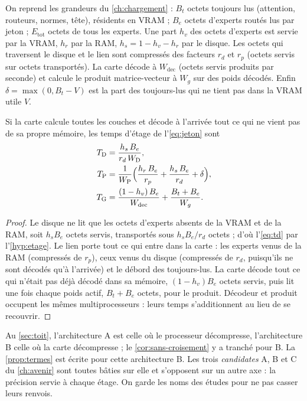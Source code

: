 On reprend les grandeurs du \cref{ch:chargement} : $B_t$ octets toujours lus (attention, routeurs, normes, tête), résidents en VRAM ; $B_e$ octets d'experts routés lus par jeton ; $E_{\mathrm{tot}}$ octets de tous les experts. Une part $h_v$ des octets d'experts est servie par la VRAM, $h_r$ par la RAM, $h_s = 1 - h_v - h_r$ par le disque. Les octets qui traversent le disque et le lien sont compressés des facteurs $r_d$ et $r_p$ (octets servis sur octets transportés). La carte décode à $W_{\mathrm{dec}}$ (octets servis produits par seconde) et calcule le produit matrice-vecteur à $W_g$ sur des poids décodés. Enfin $\delta = \max(0, B_t - V)$ est la part des toujours-lus qui ne tient pas dans la VRAM utile $V$.

\begin{proposition}\label{prop:termes}
Si la carte calcule toutes les couches et décode à l'arrivée tout ce qui ne vient pas de sa propre mémoire, les temps d'étage de l'\cref{eq:jeton} sont
\begin{align}
T_{\mathrm{D}} &= \frac{h_s\,B_e}{r_d\,W_{\mathrm{D}}}, \label{eq:td}\\
T_{\mathrm{P}} &= \frac{1}{W_{\mathrm{P}}}\Bigl(\frac{h_r\,B_e}{r_p} + \frac{h_s\,B_e}{r_d} + \delta\Bigr), \label{eq:tp}\\
T_{\mathrm{G}} &= \frac{(1-h_v)\,B_e}{W_{\mathrm{dec}}} + \frac{B_t + B_e}{W_g}. \label{eq:tg}
\end{align}
\end{proposition}

\begin{proof}
Le disque ne lit que les octets d'experts absents de la VRAM et de la RAM, soit $h_s B_e$ octets servis, transportés sous $h_s B_e/r_d$ octets ; d'où l'\cref{eq:td} par l'\cref{hyp:etage}. Le lien porte tout ce qui entre dans la carte : les experts venus de la RAM (compressés de $r_p$), ceux venus du disque (compressés de $r_d$, puisqu'ils ne sont décodés qu'à l'arrivée) et le débord des toujours-lus. La carte décode tout ce qui n'était pas déjà décodé dans sa mémoire, $(1-h_v)B_e$ octets servis, puis lit une fois chaque poids actif, $B_t + B_e$ octets, pour le produit. Décodeur et produit occupent les mêmes multiprocesseurs : leurs temps s'additionnent au lieu de se recouvrir.
\end{proof}

\begin{remarque}
Au \cref{sec:toit}, l'architecture A est celle où le processeur décompresse, l'architecture B celle où la carte décompresse ; le \cref{cor:sans-croisement} y a tranché pour B. La \cref{prop:termes} est écrite pour cette architecture B. Les trois \emph{candidates} A, B et C du \cref{ch:avenir} sont toutes bâties sur elle et s'opposent sur un autre axe : la précision servie à chaque étage. On garde les noms des études pour ne pas casser leurs renvois.
\end{remarque}

